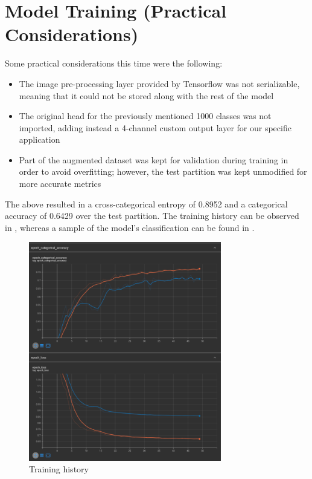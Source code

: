 \documentclass{scrartcl}
\begin{document}
\section{Model Training (Practical Considerations)}

  Some practical considerations this time were the following:
  \begin{itemize}
    \item The image pre-processing layer provided by Tensorflow was not serializable, meaning that it could not be stored along with the rest of the model
    \item The original head for the previously mentioned 1000 classes was not imported, adding instead a 4-channel custom output layer for our specific application
    \item Part of the augmented dataset was kept for validation during training in order to avoid overfitting; however, the test partition was kept unmodified for more accurate metrics
  \end{itemize}

  The above resulted in a cross-categorical entropy of 0.8952 and a categorical accuracy of 0.6429 over the test partition. The training history can be observed in , whereas a sample of the model's classification can be found in .

  \begin{figure}[ht]
    \centering
    \includegraphics[width=0.75\textwidth]{../figures/training_history.png}
    \caption{Training history}
    \label{fig:training_history}
  \end{figure}
\end{document}
